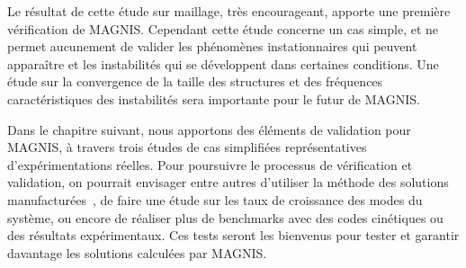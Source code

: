 \begin{refsection}
Le résultat de cette étude sur maillage, très encourageant, apporte une première
vérification de MAGNIS. Cependant cette étude concerne un cas simple,
et ne permet aucunement de valider les phénomènes instationnaires qui peuvent
apparaître et les instabilités qui se développent dans certaines
conditions. Une étude sur la convergence de la taille des structures et des
fréquences caractéristiques des instabilités sera importante pour le futur de
MAGNIS. 

Dans le chapitre suivant, nous apportons des éléments de validation pour
MAGNIS, à travers trois études de cas simplifiées représentatives
d'expérimentations réelles. Pour poursuivre le processus de vérification et
validation, on pourrait envisager entre autres d'utiliser la méthode des
solutions manufacturées~\parencite{Roy}, de faire une étude sur les taux de
croissance des modes du système, ou encore de réaliser plus de benchmarks avec
des codes cinétiques ou des résultats expérimentaux.
Ces tests seront les bienvenus pour tester et garantir davantage les solutions calculées par MAGNIS. 

%
%
\end{refsection}

